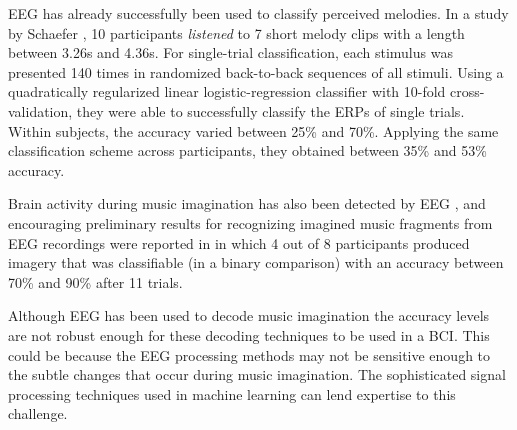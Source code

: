 EEG has already successfully been used to classify perceived melodies. 
In a study by Schaefer \etal \cite{schaefer_name_2011}, 10 participants \textit{listened} to 7 short melody clips with a length between 3.26s and 4.36s.
For single-trial classification, each stimulus was presented 140 times in randomized back-to-back sequences of all stimuli.
Using a quadratically regularized linear logistic-regression classifier with 10-fold cross-validation, they were able to successfully classify the \acp{ERP} of single trials.
Within subjects, the accuracy varied between 25\% and 70\%.
Applying the same classification scheme across participants, they obtained between 35\% and 53\% accuracy.

Brain activity during music imagination has also been detected by \ac{EEG} \cite{schaefer_shared_2013}, and encouraging preliminary results for recognizing imagined music fragments from \ac{EEG} recordings were reported in \cite{schaefer_single_2009} in which 4 out of 8 participants produced imagery that was classifiable (in a binary comparison) with an accuracy between 70\% and 90\% after 11 trials.

Although \ac{EEG} has been used to decode music imagination the accuracy levels are not robust enough for these decoding techniques to be used in a \ac{BCI}. 
This could be because the EEG processing methods may not be sensitive enough to the subtle changes that occur during music imagination. 
The sophisticated signal processing techniques used in machine learning can lend expertise to this challenge. 

